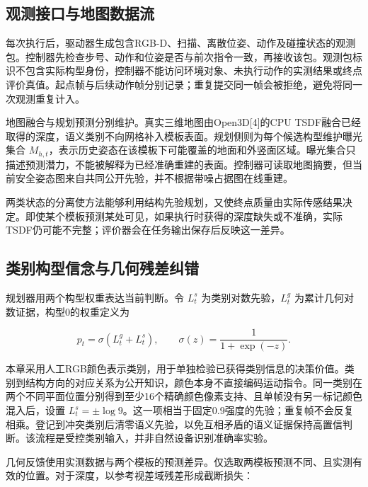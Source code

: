 \documentclass[11pt,a4paper]{article}
\begin{document}
\hypertarget{ux89c2ux6d4bux63a5ux53e3ux4e0eux5730ux56feux6570ux636eux6d41}{%
\subsection{观测接口与地图数据流}\label{ux89c2ux6d4bux63a5ux53e3ux4e0eux5730ux56feux6570ux636eux6d41}}

每次执行后，驱动器生成包含RGB-D、扫描、离散位姿、动作及碰撞状态的观测包。控制器先检查步号、动作和位姿是否与前次指令一致，再接收该包。观测包标识不包含实际构型身份，控制器不能访问环境对象、未执行动作的实测结果或终点评价真值。起点帧与后续动作帧分别记录；重复提交同一帧会被拒绝，避免将同一次观测重复计入。

地图融合与规划预测分别维护。真实三维地图由Open3D{[}4{]}的CPU TSDF融合已经取得的深度，语义类别不向网格补入模板表面。规划侧则为每个候选构型维护曝光集合 \(M_{h,t}\)，表示历史姿态在该模板下可能覆盖的地面和外竖面区域。曝光集合只描述预测潜力，不能被解释为已经准确重建的表面。控制器可读取地图摘要，但当前安全姿态图来自共同公开先验，并不根据带噪占据图在线重建。

两类状态的分离使方法能够利用结构先验规划，又使终点质量由实际传感结果决定。即使某个模板预测某处可见，如果执行时获得的深度缺失或不准确，实际TSDF仍可能不完整；评价器会在任务输出保存后反映这一差异。

\hypertarget{ux7c7bux522bux6784ux578bux4fe1ux5ff5ux4e0eux51e0ux4f55ux6b8bux5deeux7ea0ux9519}{%
\subsection{类别构型信念与几何残差纠错}\label{ux7c7bux522bux6784ux578bux4fe1ux5ff5ux4e0eux51e0ux4f55ux6b8bux5deeux7ea0ux9519}}

规划器用两个构型权重表达当前判断。令 \(L_t^s\) 为类别对数先验，\(L_t^g\) 为累计几何对数证据，构型0的权重定义为

\[
p_t=\sigma(L_t^g+L_t^s),\qquad
\sigma(z)=\frac{1}{1+\exp(-z)}.
\]

本章采用人工RGB颜色表示类别，用于单独检验已获得类别信息的决策价值。类别到结构方向的对应关系为公开知识，颜色本身不直接编码运动指令。同一类别在两个不同平面位置分别得到至少16个精确颜色像素支持、且单帧没有另一标记颜色混入后，设置 \(L_t^s=\pm\log 9\)。这一项相当于固定0.9强度的先验；重复帧不会反复相乘。登记到冲突类别后清零语义先验，以免互相矛盾的语义证据保持高置信判断。该流程是受控类别输入，并非自然设备识别准确率实验。

几何反馈使用实测数据与两个模板的预测差异。仅选取两模板预测不同、且实测有效的位置。对于深度，以参考视差域残差形成截断损失：
\end{document}
